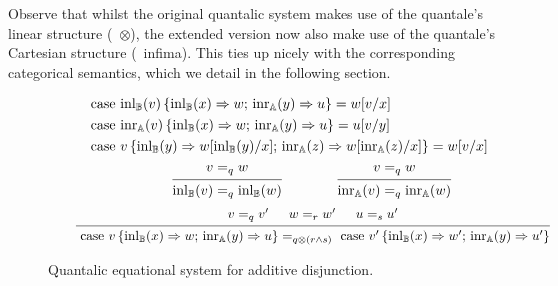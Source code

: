 \documentclass[a4paper,UKenglish,cleveref, autoref, thm-restate]{lipics-v2021}
\begin{document}
Observe that whilst the original quantalic system makes use of the quantale's
linear structure (\ie\ $\otimes$), the extended version now also make use of
the quantale's Cartesian structure (\ie\ infima). This ties up nicely with the
corresponding categorical semantics, which we detail in the following section.
  \begin{figure}[h!]
    \begin{equation*}
            \hspace{30pt}
        \begin{split}
          &\text{case } 
          \mathrm{inl}_{\mathbb{B}}(v)\, \{ \mathrm{inl}_{\mathbb{B}} (x) \Rightarrow w  
          ;\, \mathrm{inr}_{\mathbb{A}} (y) 
          \Rightarrow u\}= w[v/x]
          \\
          &\text{case } 
          \mathrm{inr}_{\mathbb{A}}(v)\, \{ \mathrm{inl}_{\mathbb{B}} (x) \Rightarrow w 
          ;\, \mathrm{inr}_{\mathbb{A}} (y) 
          \Rightarrow u\}= u[v/y]
          \\
          & \text{case } v\, \{\text{inl}_{\mathbb{B}} (y) \Rightarrow w [ \text{inl}_{\mathbb{B}}(y)/x] ;\, \text{inr}_{\mathbb{A}} (z) \Rightarrow w [ \text{inr}_{\mathbb{A}}(z)/x]\} = w[v/x] 
        \end{split}
    \end{equation*}
    \noindent\dotfill{}
    \begin{equation*}
            \hspace{75pt}
            \begin{prooftree}
                    \hypo{ v =_q w}
                    \infer1[]{\inl_\typeB(v) =_q \inl_\typeB(w)}
            \end{prooftree}
            \hspace{40pt}
            \begin{prooftree}
                    \hypo{ v =_q w}
                    \infer1[]{\inr_\typeA(v) =_q \inr_\typeA(w)}
            \end{prooftree}
    \end{equation*}
    \begin{equation*}
    \hspace{20pt}
   \begin{prooftree}
      \hypo{ v =_{q} v' }
      \hypo{w=_{r} w'}
      \hypo{u=_{s}u'}
      \infer3[]{\text{ case } v \,   \{\inl_\typeB (x) \Rightarrow w ; \, \inr_\typeA (y) 
              \Rightarrow u\} 
      =_{q\otimes(r \wedge s)} 
      \text{ case } v' 
      \,  \{\inl_\typeB (x) \Rightarrow w' ; \,\inr_\typeA (y) \Rightarrow u'\} }
  \end{prooftree}
    \end{equation*}
    \caption{Quantalic equational system for additive disjunction.}
    \label{fig:equations-in-context-cond}
    \end{figure}
\end{document}
